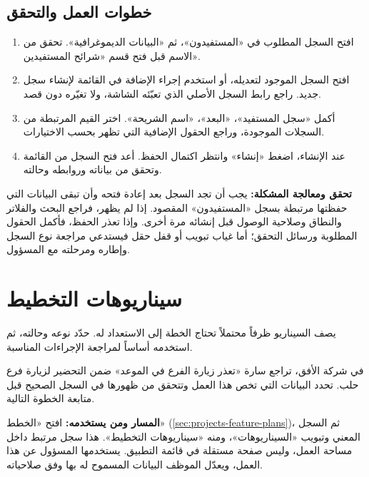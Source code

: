 \subsection{خطوات العمل والتحقق}
\begin{enumerate}
\item افتح السجل المطلوب في «المستفيدون»، ثم «البيانات الديموغرافية». تحقق من الاسم قبل فتح قسم «شرائح المستفيدين».
\item افتح السجل الموجود لتعديله، أو استخدم إجراء الإضافة في القائمة لإنشاء سجل جديد. راجع رابط السجل الأصلي الذي تعبّئه الشاشة، ولا تغيّره دون قصد.
\item أكمل «سجل المستفيد»، «البعد»، «اسم الشريحة». اختر القيم المرتبطة من السجلات الموجودة، وراجع الحقول الإضافية التي تظهر بحسب الاختيارات.
\item عند الإنشاء، اضغط «إنشاء» وانتظر اكتمال الحفظ. أعد فتح السجل من القائمة وتحقق من بياناته وروابطه وحالته.
\end{enumerate}

\textbf{تحقق ومعالجة المشكلة:} يجب أن تجد السجل بعد إعادة فتحه وأن تبقى البيانات التي حفظتها مرتبطة بسجل «المستفيدون» المقصود. إذا لم يظهر، فراجع البحث والفلاتر والنطاق وصلاحية الوصول قبل إنشائه مرة أخرى. وإذا تعذر الحفظ، فأكمل الحقول المطلوبة ورسائل التحقق؛ أما غياب تبويب أو قفل حقل فيستدعي مراجعة نوع السجل وإطاره ومرحلته مع المسؤول.

\clearpage
\section{سيناريوهات التخطيط}
\label{sec:projects-feature-planning-scenarios}

يصف السيناريو ظرفاً محتملاً تحتاج الخطة إلى الاستعداد له. حدّد نوعه وحالته، ثم استخدمه أساساً لمراجعة الإجراءات المناسبة.

\begin{rcnote}
في شركة الأفق، تراجع سارة «تعذر زيارة الفرع في الموعد» ضمن التحضير لزيارة فرع حلب. تحدد البيانات التي تخص هذا العمل وتتحقق من ظهورها في السجل الصحيح قبل متابعة الخطوة التالية.
\end{rcnote}

\textbf{المسار ومن يستخدمه:} افتح «الخطط» (\ref{sec:projects-feature-plans})، ثم السجل المعني وتبويب «السيناريوهات»، ومنه «سيناريوهات التخطيط». هذا سجل مرتبط داخل مساحة العمل، وليس صفحة مستقلة في قائمة التطبيق. يستخدمها المسؤول عن هذا العمل، ويعدّل الموظف البيانات المسموح له بها وفق صلاحياته.

